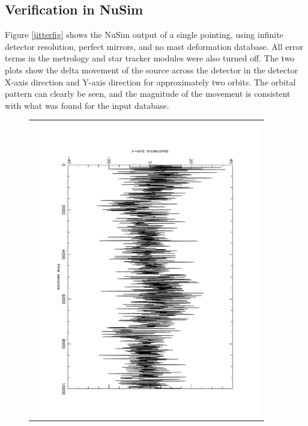 \subsection{Verification in NuSim}
Figure \ref{jitterfig} shows the NuSim output of a single pointing, using infinite detector resolution, perfect mirrors, and no mast deformation database. All error terms in the metrology and star tracker modules were also turned off. The two plots show the delta movement of the source across the detector in the detector X-axis direction and Y-axis direction for approximately two orbits. The orbital pattern can clearly be seen, and the magnitude of the movement is consistent with what was found for the input database.

\begin{figure}
\begin{tabular}{c}
\includegraphics[width=10cm, angle=90]{images/jitter_x.pdf} \\

\end{tabular}
\end{figure}
